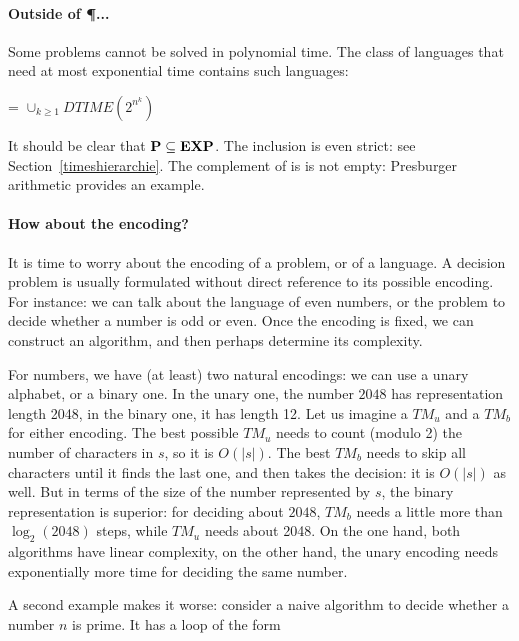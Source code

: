 \paragraph{Outside of \P ...}
Some problems cannot be solved in polynomial time. The class of
languages that need at most exponential time contains such languages:

\begin{definition}
\EXP = $\cup_{k\geq 1} DTIME(2^{n^k})$
\end{definition}

It should be clear that ${\bf P} \subseteq {\bf EXP}$. The inclusion is even strict: see Section~\ref{timeshierarchie}.
%
The complement of \EXP is is not empty: Presburger arithmetic provides
an example.

\paragraph{How about the encoding?}
It is time to worry about the encoding of a problem, or of a language.
A decision problem is usually formulated without direct reference to
its possible encoding. For instance: we can talk about the language of
even numbers, or the problem to decide whether a number is odd or
even. Once the encoding is fixed, we can construct an algorithm, and
then perhaps determine its complexity.

For numbers, we have (at least) two natural encodings: we can use a
unary alphabet, or a binary one. In the unary one, the number $2048$
has representation length 2048, in the binary one, it has length 12. Let
us imagine a $TM_u$ and a $TM_b$ for either encoding. The best
possible $TM_u$ needs to count (modulo 2) the number of characters in
$s$, so it is $O(|s|)$. The best $TM_b$ needs to skip all characters
until it finds the last one, and then takes the decision: it is
$O(|s|)$ as well. But in terms of the size of the number represented
by $s$, the binary representation is superior: for deciding about
$2048$, $TM_b$ needs a little more than $\log_2(2048)$ steps, while
$TM_u$ needs about 2048. On the one hand, both algorithms have linear
complexity, on the other hand, the unary encoding needs exponentially
more time for deciding the same number.

A second example makes it worse: consider a naive algorithm to decide
whether a number $n$ is prime. It has a loop of the form

\begin{algorithmic}
         \EndIf
    \EndWhile
\end{algorithmic}

